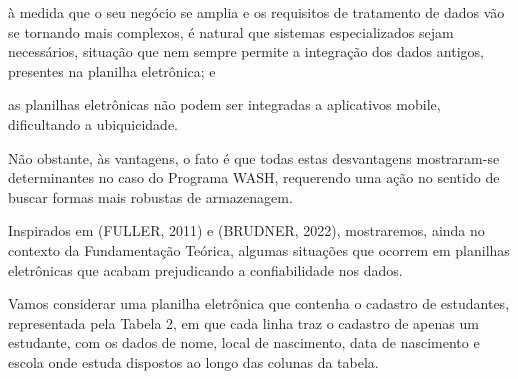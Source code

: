 \documentclass[
12pt,		%
openright,	%
twoside,  %
a4paper,			%
chapter=TITLE,		%
english,			%
french,				%
spanish,			%
brazil				%
]{USPSC-classe/USPSC}
\begin{document}
\begin{alineas}
\item \`a medida que o seu \textquotedbl  neg\'ocio \textquotedbl  se amplia e os requisitos de tratamento de dados v\~ao se tornando mais complexos, \'e natural que sistemas especializados sejam necess\'arios, situa\c{c}\~ao que nem sempre permite a integra\c{c}\~ao dos dados antigos, presentes na planilha eletr\^onica; e
\item as planilhas eletr\^onicas n\~ao podem ser integradas a aplicativos mobile, dificultando a ubiquicidade.
\end{alineas}

N\~ao obstante, \`as vantagens, o fato \'e que todas estas desvantagens mostraram-se determinantes no caso do Programa WASH, requerendo uma a\c{c}\~ao no sentido de buscar formas mais robustas de armazenagem.

















Inspirados em (FULLER, 2011) e (BRUDNER, 2022), mostraremos, ainda no contexto da Fundamenta\c{c}\~ao Te\'orica, algumas situa\c{c}\~oes que ocorrem em planilhas eletr\^onicas que acabam prejudicando a confiabilidade nos dados.

















Vamos considerar uma planilha  eletr\^onica que contenha o cadastro de estudantes, representada pela Tabela 2, em que cada linha traz o cadastro de apenas um estudante, com os dados de nome, local de nascimento, data de nascimento e escola onde estuda dispostos ao longo das colunas da tabela.
\end{document}
